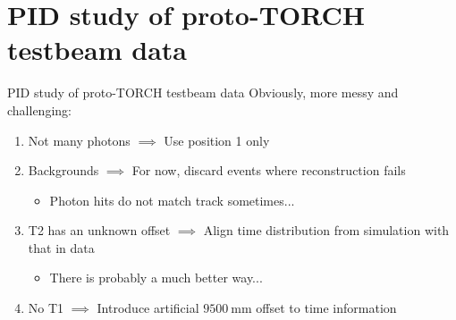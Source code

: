 \documentclass{beamer}
\begin{document}
\section{PID study of proto-TORCH testbeam data}
\begin{frame}{PID study of proto-TORCH testbeam data}
  Obviously, more messy and challenging:
  \begin{enumerate}
    \setlength\itemsep{1.0em}
    \item{Not many photons $\implies$ Use position 1 only}
    \item{Backgrounds $\implies$ For now, discard events where reconstruction fails}
    \begin{itemize}
      \item{Photon hits do not match track sometimes...}
    \end{itemize}
    \item{T2 has an unknown offset $\implies$ Align time distribution from simulation with that in data}
    \begin{itemize}
      \item{There is probably a much better way...}
    \end{itemize}
    \item{No T1 $\implies$ Introduce artificial $\SI{9500}{\milli\meter}$ offset to time information}
  \end{enumerate}
\end{frame}
\end{document}
